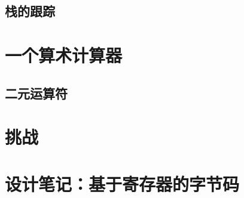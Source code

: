 \documentclass[cn,11pt,chinese]{elegantbook}
\begin{document}
\subsection{栈的跟踪}

\section{一个算术计算器}

\subsection{二元运算符}

\section{挑战}

\section{设计笔记：基于寄存器的字节码}
\end{document}
